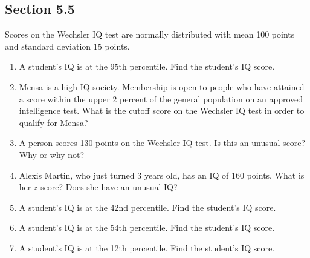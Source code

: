 \documentclass[11pt]{scrartcl}
\theoremstyle{definition}
\begin{document}
\subsection*{Section 5.5}
Scores on the Wechsler IQ test are normally distributed with mean 100 points and standard deviation 15 points.
\begin{enumerate}
	\item A student's IQ is at the 95th percentile. Find the student's IQ score.
	\item Mensa is a high-IQ society. Membership is open to people who have attained a score within the upper 2 percent of the general population on an approved intelligence test. What is the cutoff score on the Wechsler IQ test in order to qualify for Mensa?
	\item A person scores 130 points on the Wechsler IQ test. Is this an unusual score? Why or why not?
	\item Alexis Martin, who just turned 3 years old, has an IQ of 160 points. What is her $z$-score? Does she have an unusual IQ?
	\item A student's IQ is at the 42nd percentile. Find the student's IQ score.
	\item A student's IQ is at the 54th percentile. Find the student's IQ score.
	\item A student's IQ is at the 12th percentile. Find the student's IQ score.
\end{enumerate}
\end{document}
